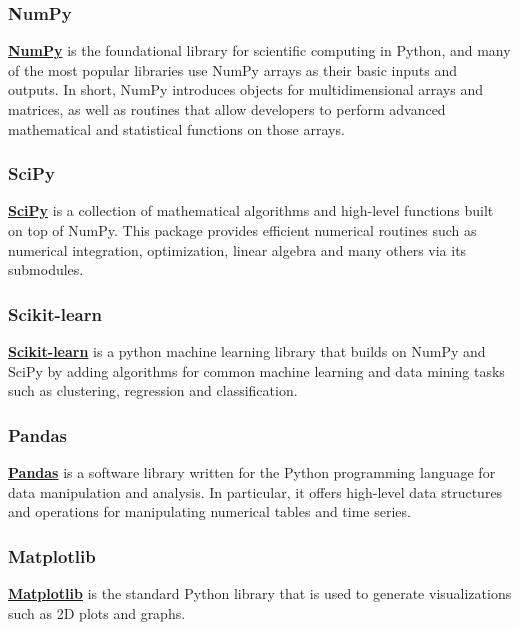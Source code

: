 \documentclass[a4paper, 12pt]{article}
\numberwithin{equation}{section}
\numberwithin{figure}{section}
\numberwithin{table}{section}
\begin{document}
	\subsubsection*{NumPy}
	
	\href{http://www.numpy.org/}{\textbf{NumPy}} is the foundational library for scientific computing in Python, and many of the most popular libraries use NumPy arrays as their basic inputs and outputs. In short, NumPy introduces objects for multidimensional arrays and matrices, as well as routines that allow developers to perform advanced mathematical and statistical functions on those arrays.
	
	\subsubsection*{SciPy}
	
	 \href{https://www.scipy.org/}{\textbf{SciPy}} is a collection of mathematical algorithms and high-level functions built on top of NumPy. This package provides efficient numerical routines such as numerical integration, optimization, linear algebra and many others via its submodules.
	
	\subsubsection*{Scikit-learn}
	
	\href{http://scikit-learn.org/stable/}{\textbf{Scikit-learn}} is a python machine learning library that builds on NumPy and SciPy by adding algorithms for common machine learning and data mining tasks such as clustering, regression and classification.
	
	\subsubsection*{Pandas}
	
	\href{https://pandas.pydata.org/}{\textbf{Pandas}} is a software library written for the Python programming language for data manipulation and analysis. In particular, it offers high-level data structures and operations for manipulating numerical tables and time series. 
	
	\subsubsection*{Matplotlib}
	\href{https://matplotlib.org/}{\textbf{Matplotlib}} is the standard Python library that is used to generate visualizations such as 2D plots and graphs.
	
\end{document}
